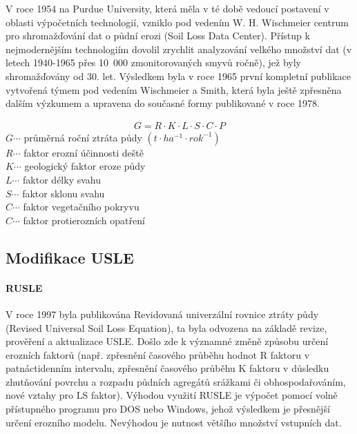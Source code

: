 V roce 1954 na Purdue University, která měla v té době vedoucí postavení v oblasti výpočetních technologií, vzniklo pod vedením W. H. Wischmeier centrum pro shromažďování dat o půdní erozi (Soil Loss Data Center). Přístup k nejmodernějším technologiím dovolil zrychlit analyzování velkého množství dat (v letech 1940-1965 přes 10~000 zmonitorovaných smyvů ročně), jež byly shromažďovány od 30. let. Výsledkem byla v roce 1965 první kompletní publikace vytvořená týmem pod vedením Wischmeier a Smith, která byla ještě zpřesněna dalším výzkumem a upravena do současné formy publikované v roce 1978. 

\begin{align}
   \label{usle1978} G=R\cdot K\cdot L\cdot S\cdot C\cdot P
\end{align}
\hspace*{2cm}$G \cdots$ průměrná roční ztráta půdy $\left( t\cdot ha^{-1}\cdot rok^{-1} \right)$\\
\hspace*{2cm}$R \cdots$ faktor erozní účinnosti deště \\
\hspace*{2cm}$K \cdots$ geologický faktor eroze půdy \\ 
\hspace*{2cm}$L \cdots$ faktor délky svahu \\ 
\hspace*{2cm}$S \cdots$ faktor sklonu svahu \\  
\hspace*{2cm}$C \cdots$ faktor vegetačního pokryvu \\
\hspace*{2cm}$C \cdots$ faktor protierozních opatření \\

\subsection{Modifikace USLE}
\paragraph{RUSLE}
V roce 1997 byla publikována Revidovaná univerzální rovnice ztráty půdy (Revised Universal Soil Loss Equation), ta byla odvozena na základě revize, prověření a aktualizace USLE. Došlo zde k významné změně způsobu určení erozních faktorů (např. zpřesnění časového průběhu hodnot R faktoru v patnáctidenním intervalu, zpřesnění časového průběhu K faktoru v důsledku zhutňování povrchu a rozpadu půdních agregátů srážkami či obhospodařováním, nové vztahy pro LS faktor). Výhodou využití RUSLE je výpočet pomocí volně přístupného programu pro DOS nebo Windows, jehož výsledkem je přesnější určení erozního modelu. Nevýhodou je nutnost většího množství vstupních dat.
